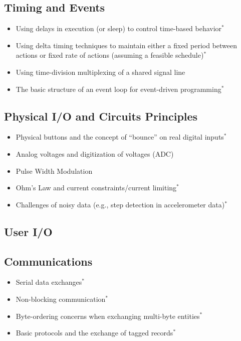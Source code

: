 \subsection{Timing and Events}
\label{sec:time}
\begin{itemize}
  \item Using delays in execution (or sleep) to control time-based behavior$^*$
  \item Using delta timing techniques to maintain either a fixed period between actions or fixed rate of actions (assuming a feasible schedule)$^*$
  \item Using time-division multiplexing of a shared signal line
  \item The basic structure of an event loop for event-driven programming$^*$
\end{itemize}

\subsection{Physical I/O and Circuits Principles}
\label{sec:pio}
\begin{itemize}
  \item Physical buttons and the concept of ``bounce'' on real digital inputs$^*$
  \item Analog voltages and digitization of voltages (ADC)
  \item Pulse Width Modulation
  \item Ohm's Law and current constraints/current limiting$^*$
  \item Challenges of noisy data (e.g., step detection in accelerometer data)$^*$
\end{itemize}

\subsection{User I/O}
\label{sec:uio}

\subsection{Communications}
\label{sec:comm}
\begin{itemize}
  \item Serial data exchanges$^*$
  \item Non-blocking communication$^*$
  \item Byte-ordering concerns when exchanging multi-byte entities$^*$
  \item Basic protocols and the exchange of tagged records$^*$
\end{itemize}

